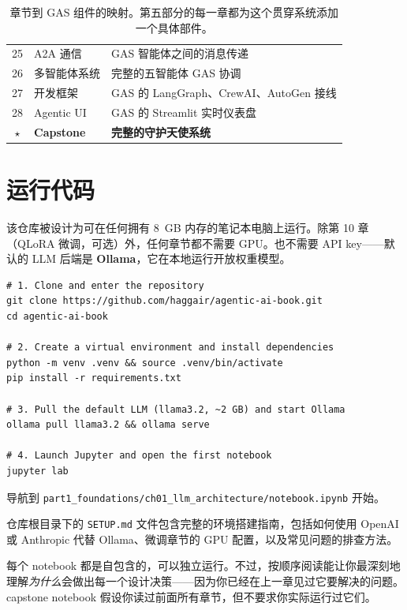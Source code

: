 \documentclass[11pt,a4paper,openany]{book}
\begin{document}
\begin{table}[ht!]
\begin{tabular}{clp{6.5cm}}
25 & A2A 通信                  & GAS 智能体之间的消息传递 \\
26 & 多智能体系统                & 完整的五智能体 GAS 协调 \\
27 & 开发框架             & GAS 的 LangGraph、CrewAI、AutoGen 接线 \\
28 & Agentic UI                         & GAS 的 Streamlit 实时仪表盘 \\
$\star$ & \textbf{Capstone}           & \textbf{完整的守护天使系统} \\
\hline
\end{tabular}
\caption{章节到 GAS 组件的映射。第五部分的每一章都为这个贯穿系统添加一个具体部件。}
\label{tab:gas-roadmap}
\end{table}

\section*{运行代码}
\label{gas-running}

该仓库被设计为可在任何拥有 8~GB 内存的笔记本电脑上运行。除第 10 章（QLoRA 微调，可选）外，任何章节都不需要 GPU。也不需要 API key——默认的 LLM 后端是 \textbf{Ollama}，它在本地运行开放权重模型。

\begin{examplebox}
\begin{verbatim}
# 1. Clone and enter the repository
git clone https://github.com/haggair/agentic-ai-book.git
cd agentic-ai-book

# 2. Create a virtual environment and install dependencies
python -m venv .venv && source .venv/bin/activate
pip install -r requirements.txt

# 3. Pull the default LLM (llama3.2, ~2 GB) and start Ollama
ollama pull llama3.2 && ollama serve

# 4. Launch Jupyter and open the first notebook
jupyter lab
\end{verbatim}
导航到 \texttt{part1\_foundations/ch01\_llm\_architecture/notebook.ipynb} 开始。
\end{examplebox}

仓库根目录下的 \texttt{SETUP.md} 文件包含完整的环境搭建指南，包括如何使用 OpenAI 或 Anthropic 代替 Ollama、微调章节的 GPU 配置，以及常见问题的排查方法。

\begin{intuitionbox}[你不必按顺序阅读各章]
每个 notebook 都是自包含的，可以独立运行。不过，按顺序阅读能让你最深刻地理解\emph{为什么}会做出每一个设计决策——因为你已经在上一章见过它要解决的问题。capstone notebook 假设你读过前面所有章节，但不要求你实际运行过它们。
\end{intuitionbox}
\end{document}
